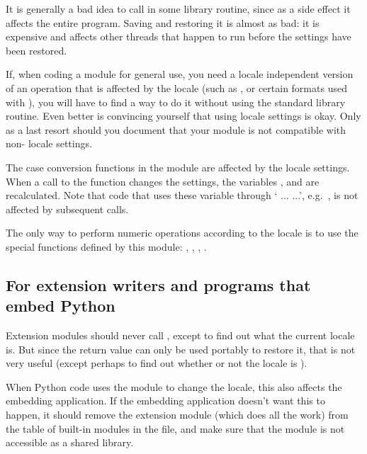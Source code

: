 It is generally a bad idea to call  in some library
routine, since as a side effect it affects the entire program.  Saving
and restoring it is almost as bad: it is expensive and affects other
threads that happen to run before the settings have been restored.

If, when coding a module for general use, you need a locale
independent version of an operation that is affected by the locale
(such as , or certain formats used with
), you will have to find a way to do it
without using the standard library routine.  Even better is convincing
yourself that using locale settings is okay.  Only as a last resort
should you document that your module is not compatible with
non- locale settings.

The case conversion functions in the
 module are affected by the
locale settings.  When a call to the  function
changes the  settings, the variables
,  and
 are recalculated.  Note that code that uses
these variable through ` ...  ...',
e.g.\ , is not affected by subsequent
 calls.

The only way to perform numeric operations according to the locale
is to use the special functions defined by this module:
, , ,
.

\subsection{For extension writers and programs that embed Python
            \label{embedding-locale}}

Extension modules should never call , except to
find out what the current locale is.  But since the return value can
only be used portably to restore it, that is not very useful (except
perhaps to find out whether or not the locale is ).

When Python code uses the  module to change the locale,
this also affects the embedding application.  If the embedding
application doesn't want this to happen, it should remove the
 extension module (which does all the work) from the
table of built-in modules in the  file, and make sure
that the  module is not accessible as a shared library.


